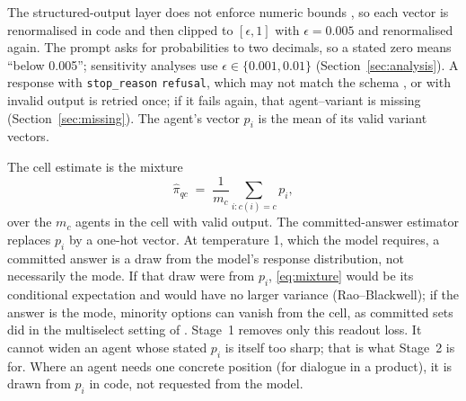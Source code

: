 \documentclass[11pt]{article}
\begin{document}
The structured-output layer does not enforce numeric bounds \citep{anthropic2026structured}, so each vector is renormalised in code and then clipped to $[\epsilon,1]$ with $\epsilon=0.005$ and renormalised again. The prompt asks for probabilities to two decimals, so a stated zero means ``below 0.005''; sensitivity analyses use $\epsilon\in\{0.001, 0.01\}$ (Section~\ref{sec:analysis}). A response with \texttt{stop\_reason} \texttt{refusal}, which may not match the schema \citep{anthropic2026structured}, or with invalid output is retried once; if it fails again, that agent--variant is missing (Section~\ref{sec:missing}). The agent's vector $p_i$ is the mean of its valid variant vectors.

The cell estimate is the mixture
\begin{equation}
\hat\pi_{qc} \;=\; \frac{1}{m_c}\sum_{i:c(i)=c} p_i,
\label{eq:mixture}
\end{equation}
over the $m_c$ agents in the cell with valid output. The committed-answer estimator replaces $p_i$ by a one-hot vector. At temperature 1, which the model requires, a committed answer is a draw from the model's response distribution, not necessarily the mode. If that draw were from $p_i$, \eqref{eq:mixture} would be its conditional expectation and would have no larger variance (Rao--Blackwell); if the answer is the mode, minority options can vanish from the cell, as committed sets did in the multiselect setting of \citet{doudkin2026marginal}. Stage~1 removes only this readout loss. It cannot widen an agent whose stated $p_i$ is itself too sharp; that is what Stage~2 is for. Where an agent needs one concrete position (for dialogue in a product), it is drawn from $p_i$ in code, not requested from the model.
\end{document}
